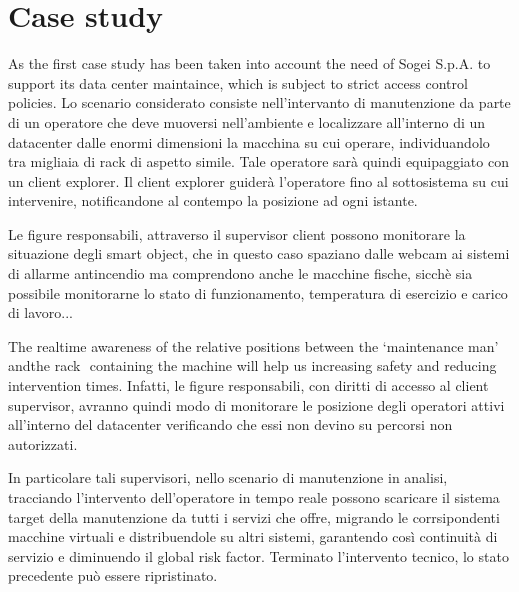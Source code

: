 \section{Case study}\label{case-study}

As the first case study has been taken into account the need of Sogei S.p.A. to support its data center maintaince, which is subject to strict access control policies. 
Lo scenario considerato consiste nell'intervanto di manutenzione da parte di un operatore che deve muoversi nell'ambiente e localizzare all'interno di un datacenter dalle enormi dimensioni la macchina su cui operare, individuandolo tra migliaia di rack di aspetto simile. Tale operatore sarà quindi equipaggiato con un client explorer. Il client explorer guiderà l'operatore fino al sottosistema su cui intervenire, notificandone al contempo la posizione ad ogni istante.

Le figure responsabili, attraverso il supervisor client possono monitorare la situazione degli smart object, che in questo caso spaziano dalle webcam ai sistemi di allarme antincendio ma comprendono anche le macchine fische, sicchè sia possibile monitorarne lo stato di funzionamento, temperatura di esercizio e carico di lavoro...


The real­time awareness of the relative positions between
the ‘maintenance man' andthe rack ­ containing the machine­ will help us
increasing safety and reducing intervention times.
Infatti, le figure responsabili, con diritti di accesso al client supervisor, avranno quindi modo di monitorare le posizione degli operatori attivi all'interno del datacenter verificando che essi non devino su percorsi non autorizzati.

In particolare tali supervisori, nello scenario di manutenzione in analisi, tracciando l'intervento dell'operatore in tempo reale possono scaricare il sistema target della manutenzione da tutti i servizi che offre, migrando le corrsipondenti macchine virtuali e distribuendole su altri sistemi, garantendo così continuità di servizio e diminuendo il global risk factor. Terminato l'intervento tecnico, lo stato precedente può essere ripristinato. 






